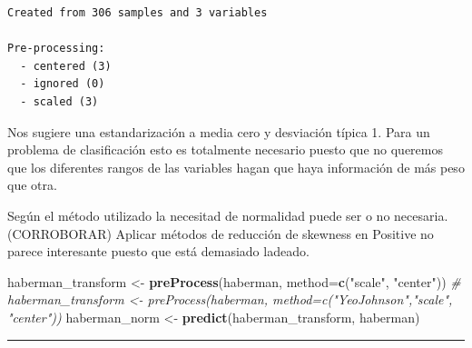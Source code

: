 \documentclass[
]{article}
\newenvironment{Shaded}{\begin{snugshade}}{\end{snugshade}}
\newcommand{\CommentTok}[1]{\textcolor[rgb]{0.56,0.35,0.01}{\textit{#1}}}
\newcommand{\DataTypeTok}[1]{\textcolor[rgb]{0.13,0.29,0.53}{#1}}
\newcommand{\KeywordTok}[1]{\textcolor[rgb]{0.13,0.29,0.53}{\textbf{#1}}}
\newcommand{\NormalTok}[1]{#1}
\newcommand{\StringTok}[1]{\textcolor[rgb]{0.31,0.60,0.02}{#1}}
\begin{document}
\begin{verbatim}
Created from 306 samples and 3 variables

Pre-processing:
  - centered (3)
  - ignored (0)
  - scaled (3)
\end{verbatim}

Nos sugiere una estandarización a media cero y desviación típica 1. Para
un problema de clasificación esto es totalmente necesario puesto que no
queremos que los diferentes rangos de las variables hagan que haya
información de más peso que otra.

Según el método utilizado la necesitad de normalidad puede ser o no
necesaria. (CORROBORAR) Aplicar métodos de reducción de skewness en
Positive no parece interesante puesto que está demasiado ladeado.

\begin{Shaded}
\begin{Highlighting}[]
\NormalTok{haberman_transform <-}\StringTok{ }\KeywordTok{preProcess}\NormalTok{(haberman, }\DataTypeTok{method=}\KeywordTok{c}\NormalTok{(}\StringTok{"scale"}\NormalTok{, }\StringTok{"center"}\NormalTok{))}
\CommentTok{# haberman_transform <- preProcess(haberman, method=c("YeoJohnson","scale", "center"))}
\NormalTok{haberman_norm <-}\StringTok{ }\KeywordTok{predict}\NormalTok{(haberman_transform, haberman)}
\end{Highlighting}
\end{Shaded}

\begin{Shaded}
\end{Shaded}

\begin{center}\rule{0.5\linewidth}{0.5pt}\end{center}
\end{document}
